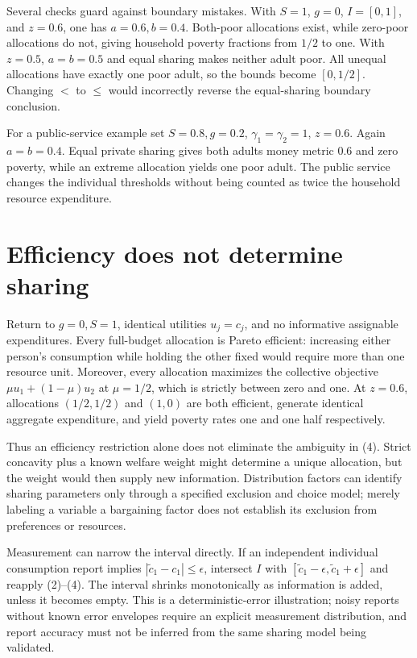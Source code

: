 \documentclass[11pt,a4paper]{article}
\begin{document}
Several checks guard against boundary mistakes. With $S=1$, $g=0$, $I=[0,1]$, and $z=0.6$, one has $a=0.6,b=0.4$. Both-poor allocations exist, while zero-poor allocations do not, giving household poverty fractions from $1/2$ to one. With $z=0.5$, $a=b=0.5$ and equal sharing makes neither adult poor. All unequal allocations have exactly one poor adult, so the bounds become $[0,1/2]$. Changing $<$ to $\le$ would incorrectly reverse the equal-sharing boundary conclusion.

For a public-service example set $S=0.8,g=0.2$, $\gamma_1=\gamma_2=1$, $z=0.6$. Again $a=b=0.4$. Equal private sharing gives both adults money metric $0.6$ and zero poverty, while an extreme allocation yields one poor adult. The public service changes the individual thresholds without being counted as twice the household resource expenditure.

\section{Efficiency does not determine sharing}
Return to $g=0,S=1$, identical utilities $u_j=c_j$, and no informative assignable expenditures. Every full-budget allocation is Pareto efficient: increasing either person's consumption while holding the other fixed would require more than one resource unit. Moreover, every allocation maximizes the collective objective $\mu u_1+(1-\mu)u_2$ at $\mu=1/2$, which is strictly between zero and one. At $z=0.6$, allocations $(1/2,1/2)$ and $(1,0)$ are both efficient, generate identical aggregate expenditure, and yield poverty rates one and one half respectively.

Thus an efficiency restriction alone does not eliminate the ambiguity in (4). Strict concavity plus a known welfare weight might determine a unique allocation, but the weight would then supply new information. Distribution factors can identify sharing parameters only through a specified exclusion and choice model; merely labeling a variable a bargaining factor does not establish its exclusion from preferences or resources.

Measurement can narrow the interval directly. If an independent individual consumption report implies $|\widetilde c_1-c_1|\le\epsilon$, intersect $I$ with $[\widetilde c_1-\epsilon,\widetilde c_1+\epsilon]$ and reapply (2)--(4). The interval shrinks monotonically as information is added, unless it becomes empty. This is a deterministic-error illustration; noisy reports without known error envelopes require an explicit measurement distribution, and report accuracy must not be inferred from the same sharing model being validated.
\end{document}
